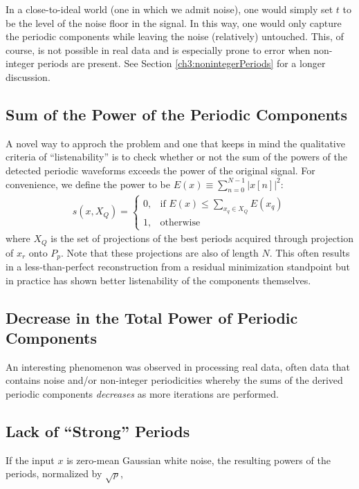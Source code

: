         In a close-to-ideal world (one in which we admit noise), one would simply set $t$ to be the level of the noise floor in the signal. In this way, one would only capture the periodic components while leaving the noise (relatively) untouched. This, of course, is not possible in real data and is especially prone to error when non-integer periods are present. See Section \ref{ch3:nonintegerPeriods} for a longer discussion.


    \subsection{Sum of the Power of the Periodic Components}
    A novel way to approch the problem and one that keeps in mind the qualitative criteria of ``listenability'' is to check whether or not the sum of the powers of the detected periodic waveforms exceeds the power of the original signal. For convenience, we define the power to be $E(x) \equiv \sum_{n = 0}^{N - 1} |x[n]|^2$:
    \begin{align}
        s(x, X_Q) = \begin{cases}
            0, & \text{if } E(x) \leq \sum_{x_q \in X_Q} E(x_q) \\
            1, & \text{otherwise}
        \end{cases}
    \end{align}
    where $X_Q$ is the set of projections of the best periods acquired through projection of $x_r$ onto $P_p$. Note that these projections are also of length $N$. This often results in a less-than-perfect reconstruction from a residual minimization standpoint but in practice has shown better listenability of the components themselves.

    \subsection{Decrease in the Total Power of Periodic Components}
    An interesting phenomenon was observed in processing real data, often data that contains noise and/or non-integer periodicities whereby the sums of the derived periodic components \emph{decreases} as more iterations are performed.

    \subsection{Lack of ``Strong'' Periods}
    If the input $x$ is zero-mean Gaussian white noise, the resulting powers of the periods, normalized by $\sqrt{p}$, 



